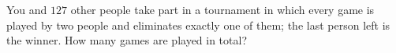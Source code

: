 You and $127$ other people take part in a tournament in which every game is played by two people and eliminates exactly one of them; the last person left is the winner. How many games are played in total?
